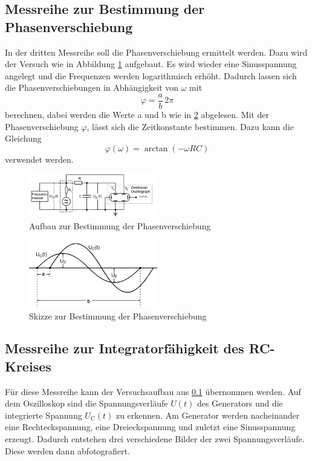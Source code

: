 \subsection{Messreihe zur Bestimmung der Phasenverschiebung}
\label{subsec:Phase}
In der dritten Messreihe soll die Phasenverschiebung ermittelt werden. Dazu wird der Versuch wie in Abbildung \ref{fig:aufbauphi} aufgebaut.
Es wird wieder eine Sinusspannung angelegt und die Frequenzen werden logarithmisch erhöht.
Dadurch lassen sich die Phasenverschiebungen in Abhängigkeit von $\omega$ mit
\begin{equation}
    \varphi=\frac{a}{b} \, 2 \pi \label{eqn:phiab}
\end{equation}
berechnen, dabei werden die Werte a und b wie in \ref{fig:wertphi} abgelesen.
Mit der Phasenverschiebung $\varphi$, lässt sich die Zeitkonstante bestimmen. Dazu kann die Gleichung
\begin{equation}
    \label{eqn:ficken}
    \varphi (\omega)=\arctan (-\omega RC)
\end{equation}
verwendet werden.
\begin{figure}
    \centering
    \caption{Aufbau zur Bestimmung der Phasenverschiebung} 
    \label{fig:aufbauphi}
    \includegraphics[width = 0.5\textwidth]{pics/phasenverschiebung.png}
\end{figure}
\begin{figure}
    \centering
    \caption{Skizze zur Bestimmung der Phasenverschiebung} 
    \label{fig:wertphi}
    \includegraphics[width = 0.5\textwidth]{pics/werteabl.png}
\end{figure}
\subsection{Messreihe zur Integratorfähigkeit des RC-Kreises}
Für diese Messreihe kann der Versuchsaufbau aus \ref{subsec:Phase} übernommen werden.
Auf dem Oszilloskop sind die Spannungsverläufe $U(t)$ des Generators und die integrierte Spannung $U_\text{C}(t)$ zu erkennen.
Am Generator werden nacheinander eine Rechteckspannung, eine Dreieckspannung und zuletzt eine Sinusspannung erzeugt.
Dadurch entstehen drei verschiedene Bilder der zwei Spannungsverläufe. Diese werden dann abfotografiert. 